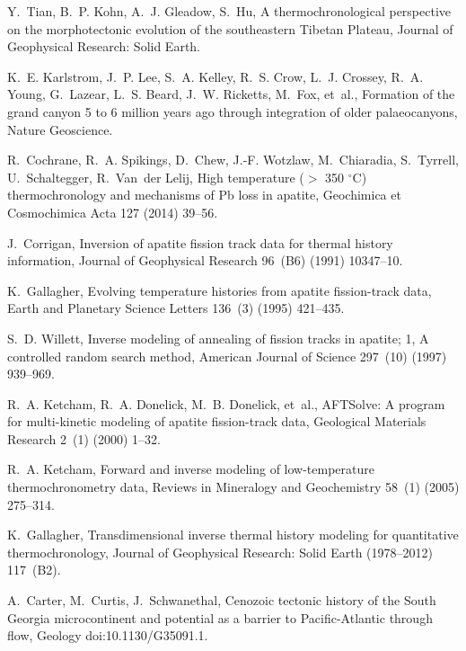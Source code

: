 \documentclass{article}
\begin{document}
\begin{thebibliography}{26}

Y.~Tian, B.~P. Kohn, A.~J. Gleadow, S.~Hu, {A thermochronological perspective
  on the morphotectonic evolution of the southeastern Tibetan Plateau}, Journal
  of Geophysical Research: Solid Earth.

K.~E. Karlstrom, J.~P. Lee, S.~A. Kelley, R.~S. Crow, L.~J. Crossey, R.~A.
  Young, G.~Lazear, L.~S. Beard, J.~W. Ricketts, M.~Fox, et~al., Formation of
  the grand canyon 5 to 6 million years ago through integration of older
  palaeocanyons, Nature Geoscience.

R.~Cochrane, R.~A. Spikings, D.~Chew, J.-F. Wotzlaw, M.~Chiaradia, S.~Tyrrell,
  U.~Schaltegger, R.~Van~der Lelij, {High temperature ($>$ 350 $^\circ$C)
  thermochronology and mechanisms of Pb loss in apatite}, Geochimica et
  Cosmochimica Acta 127 (2014) 39--56.

J.~Corrigan, Inversion of apatite fission track data for thermal history
  information, Journal of Geophysical Research 96~(B6) (1991) 10347--10.

K.~Gallagher, Evolving temperature histories from apatite fission-track data,
  Earth and Planetary Science Letters 136~(3) (1995) 421--435.

S.~D. Willett, {Inverse modeling of annealing of fission tracks in apatite; 1,
  A controlled random search method}, American Journal of Science 297~(10)
  (1997) 939--969.

R.~A. Ketcham, R.~A. Donelick, M.~B. Donelick, et~al., {AFTSolve: A program for
  multi-kinetic modeling of apatite fission-track data}, Geological Materials
  Research 2~(1) (2000) 1--32.

R.~A. Ketcham, Forward and inverse modeling of low-temperature
  thermochronometry data, Reviews in Mineralogy and Geochemistry 58~(1) (2005)
  275--314.

K.~Gallagher, Transdimensional inverse thermal history modeling for
  quantitative thermochronology, Journal of Geophysical Research: Solid Earth
  (1978--2012) 117~(B2).

A.~Carter, M.~Curtis, J.~Schwanethal, {Cenozoic tectonic history of the South
  Georgia microcontinent and potential as a barrier to Pacific-Atlantic through
  flow}, Geology doi:10.1130/G35091.1.


\end{thebibliography}
\end{document}
